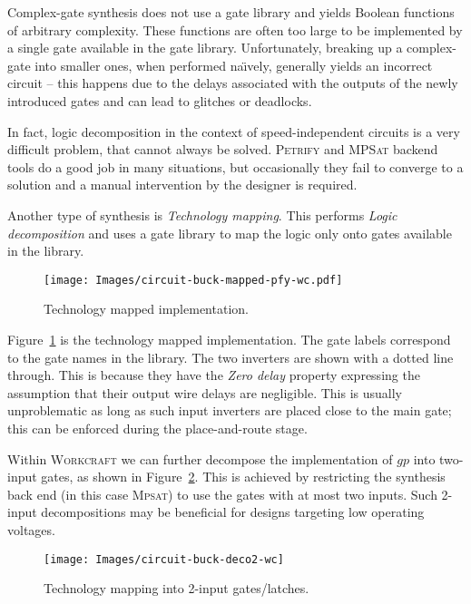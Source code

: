 \documentclass[british, journal]{IEEEtran}
\newcommand{\noun}[1]{\textsc{#1}}
\begin{document}
Complex-gate synthesis does not use a gate library and yields Boolean functions of arbitrary complexity.
These functions are often too large to be implemented by a single gate available in the gate library.
Unfortunately, breaking up a complex-gate into smaller ones, when performed na\"{\i}vely, generally yields
an incorrect circuit -- this happens due to the delays associated with the outputs of the newly introduced gates and can lead to glitches or deadlocks.

In fact, logic decomposition in the context of speed-independent circuits is a very difficult problem,
that cannot always be solved. \noun{Petrify} and \noun{MPSat} backend tools do a good job in many situations,
but occasionally they fail to converge to a solution and a manual intervention by the designer is required.

Another type of synthesis is \emph{Technology mapping}. This performs \emph{Logic decomposition} and uses a gate library to map the logic only onto gates available in the library.

\begin{figure}[h]
\begin{centering}
\texttt{[image: Images/circuit-buck-mapped-pfy-wc.pdf]}
\par\end{centering}

\protect\caption{\label{fig:tech-mapped-circuit}Technology mapped implementation.}
\end{figure}

Figure~\ref{fig:tech-mapped-circuit} is the technology mapped implementation.
The gate labels correspond to the gate names in the library.
The two inverters are shown with a dotted line through.
This is because they have the \emph{Zero delay} property expressing the assumption that their output wire delays are negligible.
This is usually unproblematic as long as such input inverters are placed close to the main gate;
this can be enforced during the place-and-route stage.

Within \noun{Workcraft} we can further decompose the implementation of $gp$ into two-input gates,
as shown in Figure~\ref{fig:circuit-buck-deco2}. This is achieved by restricting the synthesis
back end (in this case \noun{Mpsat}) to use the gates with at most two inputs.
Such 2-input decompositions may be beneficial for designs targeting low
operating voltages.

\begin{figure}[h]
\begin{centering}
\texttt{[image: Images/circuit-buck-deco2-wc]}
\par\end{centering}
\protect\caption{\label{fig:circuit-buck-deco2}Technology mapping into 2-input gates/latches.}
\end{figure}
\end{document}
